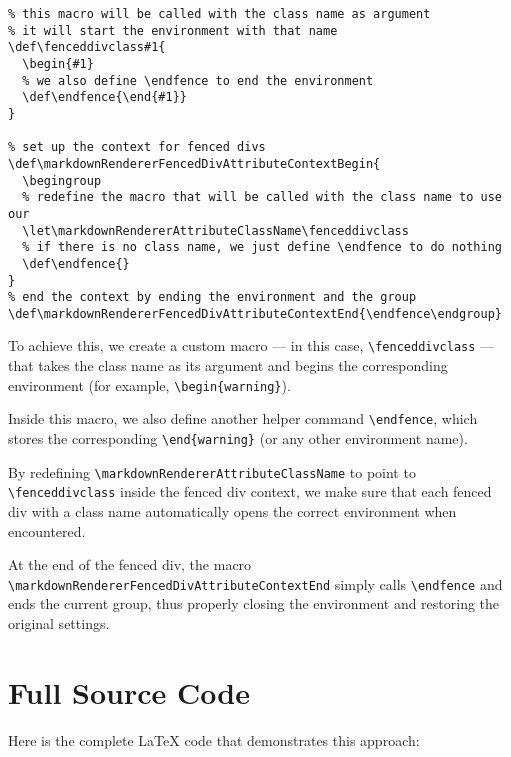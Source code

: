 \documentclass[]{article}
\def\fenceddivclass#1{
  \begin{#1}
  \def\endfence{\end{#1}}
}
\def\markdownRendererFencedDivAttributeContextBegin{
  \begingroup
  \let\markdownRendererAttributeClassName\fenceddivclass
  \def\endfence{}
}
\def\markdownRendererFencedDivAttributeContextEnd{\endfence\endgroup}
\begin{document}
\begin{verbatim}
% this macro will be called with the class name as argument 
% it will start the environment with that name
\def\fenceddivclass#1{
  \begin{#1}
  % we also define \endfence to end the environment
  \def\endfence{\end{#1}}
}

% set up the context for fenced divs
\def\markdownRendererFencedDivAttributeContextBegin{
  \begingroup
  % redefine the macro that will be called with the class name to use our 
  \let\markdownRendererAttributeClassName\fenceddivclass
  % if there is no class name, we just define \endfence to do nothing
  \def\endfence{}
}
% end the context by ending the environment and the group
\def\markdownRendererFencedDivAttributeContextEnd{\endfence\endgroup}
\end{verbatim}


To achieve this, we create a custom macro --- in this case,
\Verb|\fenceddivclass| --- that takes the class name as its argument and begins
the corresponding environment (for example, \Verb|\begin{warning}|).  

Inside this macro, we also define another helper command \Verb|\endfence|,
which stores the corresponding \Verb|\end{warning}| (or any other environment
name).  

By redefining \Verb|\markdownRendererAttributeClassName| to point to
\Verb|\fenceddivclass| inside the fenced div context, we make sure that each
fenced div with a class name automatically opens the correct environment when
encountered.  

At the end of the fenced div, the macro
\Verb|\markdownRendererFencedDivAttributeContextEnd| simply calls
\Verb|\endfence| and ends the current group, thus properly closing the
environment and restoring the original settings.


\section{Full Source Code}

Here is the complete \LaTeX{} code that demonstrates this approach:
\end{document}

